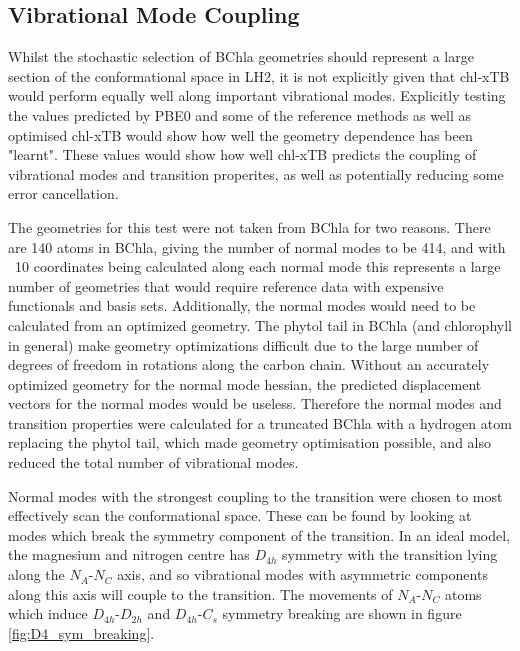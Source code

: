 \subsection{Vibrational Mode Coupling}
\label{subsec:pot_energy_surfaces}

Whilst the stochastic selection of BChla geometries should represent a large section 
of the conformational space in LH2, it is not explicitly given that chl-xTB would
perform equally well along important vibrational modes. Explicitly testing the
values predicted by PBE0 and some of the reference methods as well as optimised
chl-xTB would show how well the geometry dependence has been "learnt". These values
would show how well chl-xTB predicts the coupling of vibrational modes and transition 
properites, as well as potentially reducing some error cancellation.

The geometries for this test were not taken from BChla for two reasons. There are
140 atoms in BChla, giving the number of normal modes to be 414, and with ~10 coordinates
being calculated along each normal mode this represents a large number of geometries
that would require reference data with expensive functionals and basis sets. Additionally,
the normal modes would need to be calculated from an optimized geometry. The phytol
tail in BChla (and chlorophyll in general) make geometry optimizations difficult
due to the large number of degrees of freedom in rotations along the carbon chain. 
Without an accurately optimized geometry for the normal mode hessian, the predicted 
displacement vectors for the normal modes would be useless. Therefore the normal
modes and transition properties were calculated for a truncated BChla with a hydrogen
atom replacing the phytol tail, which made geometry optimisation possible, and also
reduced the total number of vibrational modes.

Normal modes with the strongest coupling to the \Qy transition were chosen to most
effectively scan the conformational space. These can be found by looking at modes
which break the symmetry component of the \Qy transition. In an ideal model, the 
magnesium and nitrogen centre has $D_{4h}$ symmetry with the \Qy transition lying 
along the $N_A$-$N_C$ axis, and so vibrational modes with asymmetric components 
along this axis will couple to the transition. The movements of $N_A$-$N_C$ atoms 
which induce $D_{4h}$-$D_{2h}$ and $D_{4h}$-$C_{s}$ symmetry breaking are shown
in figure \ref{fig:D4_sym_breaking}.

